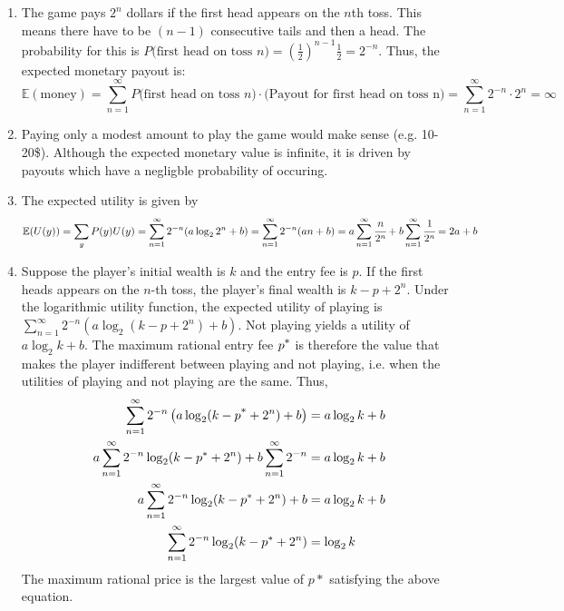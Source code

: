 \begin{solution}

	\begin{enumerate}
		\item The game pays $2^n$ dollars if the first head appears on the $n$th toss. This means there have to be $(n-1)$ consecutive tails and then a head. The probability for this is $P(\text{first head on toss $n$)}= (\frac{1}{2})^{n-1} \frac{1}{2} = 2^{-n}$. Thus, the expected monetary payout is:
			$$
			\mathbb{E}(\text{money}) = \sum_{n=1}^{\infty} P(\text{first head on toss $n$)} \cdot \text{(Payout for first head on toss n)} = \sum_{n=1}^{\infty} 2^{-n} \cdot 2^n = \infty
			$$
		\item Paying only a modest amount to play the game would make sense (e.g. 10-20\$). Although the expected monetary value is infinite, it is driven by payouts which have a negligble probability of occuring.
		\item The expected utility is given by 
			$$
			\mathbb{E}(U(y)) = \sum_y P(y) U(y) = \sum_{n=1}^{\infty} 2^{-n} (a \log_2 2^n + b) = \sum_{n=1}^{\infty} 2^{-n} (an + b)\\
			= a\sum_{n=1}^{\infty}\cfrac{n}{2^n} + b\sum_{n=1}^{\infty}\cfrac{1}{2^n} = 2a + b 
			$$
		\item Suppose the player's initial wealth is $k$ and the entry fee is $p$. If the first heads appears on the $n$-th toss, the player's final wealth is $k-p+2^n$. Under the logarithmic utility function, the expected utility of playing is $\sum_{n=1}^{\infty} 2^{-n}\left(a\log_2(k-p+2^n)+b\right)$. Not playing yields a utility of $a\log_2 k+b$. The maximum rational entry fee $p^\*$ is therefore the value that makes the player indifferent between playing and not playing, i.e. when the utilities of playing and not playing are the same. Thus,
		\begin{align*}
		\sum_{n=1}^{\infty} 2^{-n}\left(a\log_2(k-p^\*+2^n)+b\right) &= a\log_2 k+b \\
		a\sum_{n=1}^\infty 2^{-n}\log_2(k-p^*+2^n) + b\sum_{n=1}^{\infty}2^{-n} &= a\log_2 k + b \\
		a\sum_{n=1}^\infty 2^{-n}\log_2(k-p^*+2^n) + b &= a\log_2 k + b \\
		\sum_{n=1}^\infty 2^{-n}\log_2(k-p^*+2^n) &= \log_2 k
		\end{align*}
    The maximum rational price is the largest value of $p*$ satisfying the above equation.
	\end{enumerate}

\end{solution}

